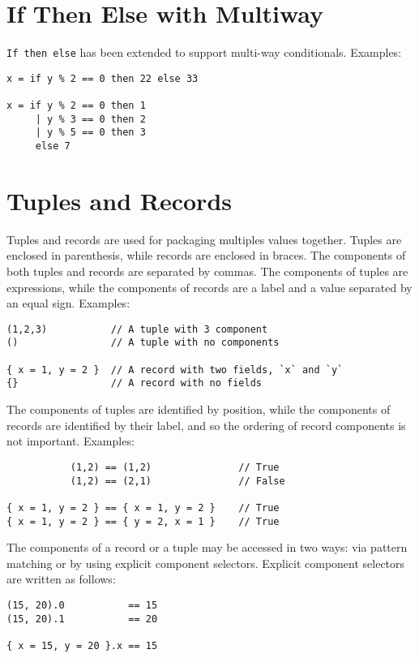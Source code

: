 \section{If Then Else with Multiway}\label{if-then-else-with-multiway}

\texttt{If\ then\ else} has been extended to support multi-way
conditionals. Examples:

\begin{verbatim}
x = if y % 2 == 0 then 22 else 33

x = if y % 2 == 0 then 1
     | y % 3 == 0 then 2
     | y % 5 == 0 then 3
     else 7
\end{verbatim}

\section{Tuples and Records}\label{tuples-and-records}

Tuples and records are used for packaging multiples values together.
Tuples are enclosed in parenthesis, while records are enclosed in
braces. The components of both tuples and records are separated by
commas. The components of tuples are expressions, while the components
of records are a label and a value separated by an equal sign. Examples:

\begin{verbatim}
(1,2,3)           // A tuple with 3 component
()                // A tuple with no components

{ x = 1, y = 2 }  // A record with two fields, `x` and `y`
{}                // A record with no fields
\end{verbatim}

The components of tuples are identified by position, while the
components of records are identified by their label, and so the ordering
of record components is not important. Examples:

\begin{verbatim}
           (1,2) == (1,2)               // True
           (1,2) == (2,1)               // False

{ x = 1, y = 2 } == { x = 1, y = 2 }    // True
{ x = 1, y = 2 } == { y = 2, x = 1 }    // True
\end{verbatim}

The components of a record or a tuple may be accessed in two ways: via
pattern matching or by using explicit component selectors. Explicit
component selectors are written as follows:

\begin{verbatim}
(15, 20).0           == 15
(15, 20).1           == 20

{ x = 15, y = 20 }.x == 15
\end{verbatim}

